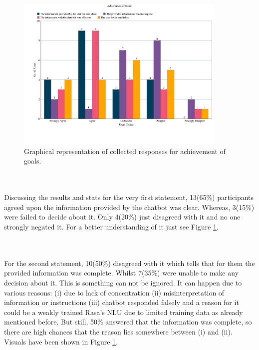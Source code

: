 \begin{figure}[!h]
    \centering
    \includegraphics[width=0.9\textwidth]{img/Achievement_of_Goals_Updated.png}
    \caption{Graphical representation of collected responses for achievement of goals.}
    \label{fig:achievGoals}
\end{figure}
\\~\\
Discussing the results and stats for the very first statement, 13(65\%) participants agreed upon the information provided by the chatbot was clear. Whereas, 3(15\%) were failed to decide about it. Only 4(20\%) just disagreed with it and no one strongly negated it. For a better understanding of it just see Figure \ref{fig:achievGoals}.

\\~\\
For the second statement, 10(50\%) disagreed with it which tells that for them the provided information was complete. Whilst 7(35\%) were unable to make any decision about it. This is something can not be ignored. It can happen due to various reasons: (i) due to lack of concentration (ii) misinterpretation of information or instructions (iii) chatbot responded falsely and a reason for it could be a weakly trained Rasa's NLU due to limited training data as already mentioned before. But still, 50\% answered that the information was complete, so there are high chances that the reason lies somewhere between (i) and (ii). Visuals have been shown in Figure \ref{fig:achievGoals}.

